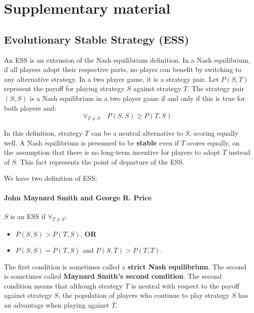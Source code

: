 \section{Supplementary material}
\subsection{Evolutionary Stable Strategy (ESS)}
An ESS is an extension of the Nash equilibrium definition. In a Nash equilibrium, if all players adopt their respective parts, no player can benefit by switching to any alternative strategy. In a two player game, it is a strategy pair. Let $P(S,T)$ represent the payoff for playing strategy $S$ against strategy $T$.  The strategy pair $(S, S)$ is a Nash equilibrium in a two player game if and only if this is true for both players and: 
$$\forall_{T\neq S} \quad P(S,S) \geq P(T,S)$$

In this definition, strategy $T$ can be a neutral alternative to $S$, scoring equally well. A Nash equilibrium is presumed to be \textbf{stable} even if $T$ scores equally, on the assumption that there is no long-term incentive for players to adopt $T$ instead of $S$.  This fact represents the point of departure of the ESS.

We have two definition of ESS:
\paragraph{John Maynard Smith and George R. Price} $S$ is an ESS if $\forall_{T\neq S}$:
	\begin{itemize}
		\item $P(S,S) > P(T,S)$, \textbf{OR}
		\item $P(S,S) = P(T,S)$ and $P(S,T) > P(T,T)$.
	\end{itemize}
The first condition is sometimes called a \textbf{strict Nash equilibrium}. The second is sometimes called \textbf{Maynard Smith's second condition}. The second condition means that although strategy $T$ is neutral with respect to the payoff against strategy $S$, the population of players who continue to play strategy $S$ has an advantage when playing against $T$.

